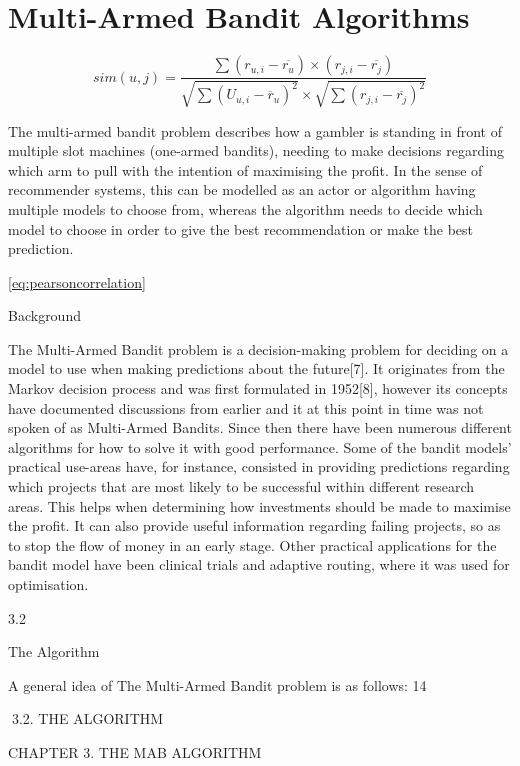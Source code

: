 \chapter{Multi-Armed Bandit Algorithms}

\[
\label{eq:pearsoncorrelation} \tag{23}
sim(u, j) = \frac{\sum \left ( r_{u,i} - \overline{r_{u}} \right ) \times \left ( r_{j,i} - \overline{r_{j}} \right )}{\sqrt{\sum \left ( U_{u, i} - \overline{r}_{u} \right )^{2}}\times \sqrt{\sum \left ( r_{j,i} - \overline{r_{j}} \right )^{2}}}

\]

The multi-armed bandit problem describes how a gambler is standing in front of multiple slot machines (one-armed bandits), needing to make decisions regarding which arm to pull with the intention of maximising the profit.
In the sense of recommender systems, this can be modelled as an actor or algorithm having multiple models to choose from, whereas the algorithm needs to decide which model to choose in order to give the best recommendation or make the best prediction.

\eqref{eq:pearsoncorrelation}


Background

The Multi-Armed Bandit problem is a decision-making problem for deciding on a model
to use when making predictions about the future[7]. It originates from the Markov decision process and was first formulated in 1952[8], however its concepts have documented
discussions from earlier and it at this point in time was not spoken of as Multi-Armed
Bandits. Since then there have been numerous different algorithms for how to solve it
with good performance.
Some of the bandit models’ practical use-areas have, for instance, consisted in providing
predictions regarding which projects that are most likely to be successful within different
research areas. This helps when determining how investments should be made to maximise the profit. It can also provide useful information regarding failing projects, so as
to stop the flow of money in an early stage. Other practical applications for the bandit
model have been clinical trials and adaptive routing, where it was used for optimisation.

3.2

The Algorithm

A general idea of The Multi-Armed Bandit problem is as follows:
14

3.2. THE ALGORITHM

CHAPTER 3. THE MAB ALGORITHM

